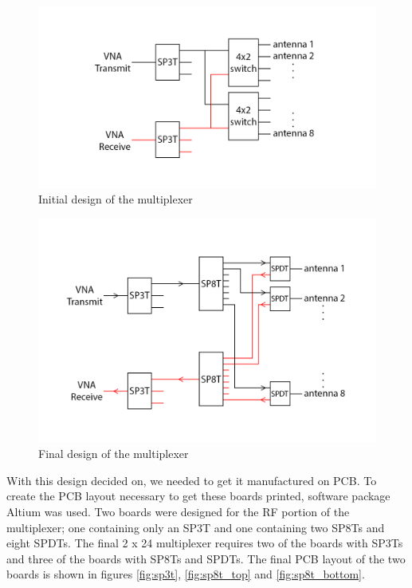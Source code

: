 \begin{figure}[h]
	\begin{center}
		\includegraphics[width=5in]{./images/mp_initial_layout.png}
		\caption{Initial design of the multiplexer}
		\label{fig:mp_initial_layout}
	\end{center}
\end{figure}

\begin{figure}[h]
	\begin{center}
		\includegraphics[width=5in]{./images/mp_final_layout.png}
		\caption{Final design of the multiplexer}
		\label{fig:mp_final_layout}
	\end{center}
\end{figure}


With this design decided on, we needed to get it manufactured on PCB. To create the PCB layout necessary to get these boards printed, software package Altium was used. Two boards were designed for the RF portion of the multiplexer; one containing only an SP3T and one containing two SP8Ts and eight SPDTs. The final 2 x 24 multiplexer requires two of the boards with SP3Ts and three of the boards with SP8Ts and SPDTs. The final PCB layout of the two boards is shown in figures \ref{fig:sp3t}, \ref{fig:sp8t_top} and \ref{fig:sp8t_bottom}.

